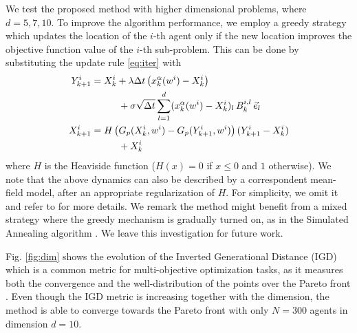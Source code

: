 \documentclass[letterpaper, 10 pt, conference]{ieeeconf}  %
\begin{document}
We test the proposed method with higher dimensional problems, where $d=5,7,10$. To improve the  algorithm performance, we employ a greedy strategy which updates the location of the $i$-th agent only if the new location improves the objective function value of the $i$-th sub-problem. This can be done by substituting the update rule \eqref{eq:iter} with
\begin{align}
Y^i_{k+1} &= X^i_k + \lambda\Delta t\left (x^\alpha_k(w^i) - X^i_k \right) \notag
\\
&\hspace{1cm} + \sigma \sqrt{\Delta t} \sum_{l=1}^d (x^\alpha_k(w^i) - X^i_k)_l \, B_{k}^{i,l}\, \vec{e}_l 
\label{eq:greedy}
\\
X^i_{k+1} & =H\left( G_p(X^i_k, w^i) - G_p(Y^i_{k+1}, w^i)  \right) ( Y^i_{k+1} - X^i_k)  \notag \\
&\hspace{1cm} + X^i_k \notag
\end{align}
where $H$ is the Heaviside function ($H(x) = 0$ if $x\leq0$ and $1$ otherwise). We note that the above dynamics can also be described by a correspondent mean-field model, after an appropriate regularization of $H$. 
For simplicity, we omit it and refer to \cite{pinnau2017consensus, fornasier2021consensusbased} for more details. We remark the method might benefit from a mixed strategy where the greedy mechanism is gradually turned on, as in the Simulated Annealing algorithm \cite{kirkpatrick1983annealing}. We leave this investigation for future work.

Fig. \ref{fig:dim} shows the evolution of the Inverted Generational Distance (IGD) which is a common metric for multi-objective optimization tasks, as it measures both the convergence and the well-distribution of the points over the Pareto front \cite{cheng2012performance}. Even though the IGD metric is increasing together with the dimension, the method is able to converge towards the Pareto front with only $N=300$ agents in dimension $d=10$.


%
%
\end{document}
